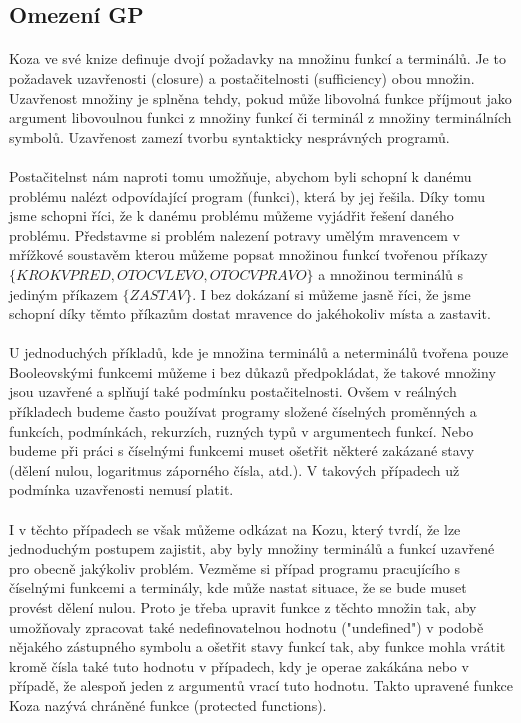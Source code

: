 \documentclass[bc,male,java,dept460]{diploma}		%
\begin{document}
\subsection{Omezení GP}
\paragraph*{}
Koza ve své knize definuje \cite{kozagp} dvojí požadavky na množinu funkcí a terminálů. Je to požadavek uzavřenosti (closure) a postačitelnosti (sufficiency) obou množin. Uzavřenost množiny je splněna tehdy, pokud může libovolná funkce příjmout jako argument libovoulnou funkci z množiny funkcí či terminál z množiny terminálních symbolů. Uzavřenost zamezí tvorbu syntakticky nesprávných programů.

\paragraph*{}
Postačitelnst nám naproti tomu umožňuje, abychom byli schopní k danému problému nalézt odpovídající program (funkci), která by jej řešila. Díky tomu jsme schopni říci, že k danému problému můžeme vyjádřit řešení daného problému. Představme si problém nalezení potravy umělým mravencem v mřížkové soustavěm kterou můžeme popsat množinou funkcí tvořenou příkazy $\{KROK VPRED, OTOC VLEVO, OTOC VPRAVO\}$ a množinou terminálů s jediným příkazem $\{ZASTAV\}$. I bez dokázaní si můžeme jasně říci, že jsme schopní díky těmto příkazům dostat mravence do jakéhokoliv místa a zastavit.

\paragraph*{}
U jednoduchých příkladů, kde je množina terminálů a neterminálů tvořena pouze Booleovskými funkcemi můžeme i bez důkazů předpokládat, že takové množiny jsou uzavřené a splňují také podmínku postačitelnosti. Ovšem v reálných příkladech budeme často používat programy složené číselných proměnných a funkcích, podmínkách, rekurzích, ruzných typů v argumentech funkcí. Nebo budeme při práci s číselnými funkcemi muset ošetřit některé zakázané stavy (dělení nulou, logaritmus záporného čísla, atd.). V takových případech už podmínka uzavřenosti nemusí platit.

\paragraph*{}
I v těchto případech se však můžeme odkázat na Kozu, který tvrdí, že lze jednoduchým postupem zajistit, aby byly množiny terminálů a funkcí uzavřené pro obecně jakýkoliv problém. Vezměme si případ programu pracujícího s číselnými funkcemi a terminály, kde může nastat situace, že se bude muset provést dělení nulou. Proto je třeba upravit funkce z těchto množin tak, aby umožňovaly zpracovat také nedefinovatelnou hodnotu ("undefined") v podobě nějakého zástupného symbolu a ošetřit stavy funkcí tak, aby funkce mohla vrátit kromě čísla také tuto hodnotu v případech, kdy je operae zakákána nebo v případě, že alespoň jeden z argumentů vrací tuto hodnotu. Takto upravené funkce Koza nazývá chráněné funkce (protected functions).
\end{document}
